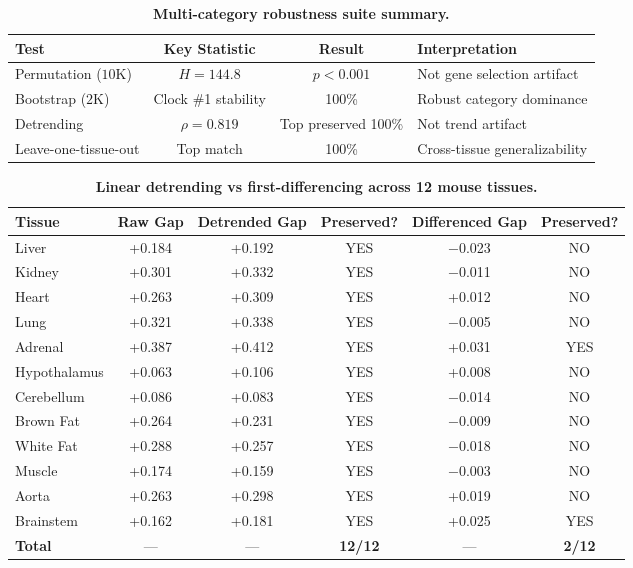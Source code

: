\documentclass[11pt,a4paper]{article}
\begin{document}
\begin{table}[H]
\centering
\caption{\textbf{Multi-category robustness suite summary.}}
\label{tab:multicat_robust}
\begin{tabular}{lccl}
\toprule
\textbf{Test} & \textbf{Key Statistic} & \textbf{Result} & \textbf{Interpretation} \\
\midrule
Permutation ($10$K) & $H = 144.8$ & $p < 0.001$ & Not gene selection artifact \\
Bootstrap ($2$K) & Clock \#1 stability & 100\% & Robust category dominance \\
Detrending & $\rho = 0.819$ & Top preserved 100\% & Not trend artifact \\
Leave-one-tissue-out & Top match & 100\% & Cross-tissue generalizability \\
\bottomrule
\end{tabular}
\end{table}

\begin{table}[H]
\centering
\caption{\textbf{Linear detrending vs first-differencing across 12 mouse tissues.}}
\label{tab:detrend}
\begin{tabular}{lccccc}
\toprule
Tissue & Raw Gap & Detrended Gap & Preserved? & Differenced Gap & Preserved? \\
\midrule
Liver & +0.184 & +0.192 & YES & $-$0.023 & NO \\
Kidney & +0.301 & +0.332 & YES & $-$0.011 & NO \\
Heart & +0.263 & +0.309 & YES & +0.012 & NO \\
Lung & +0.321 & +0.338 & YES & $-$0.005 & NO \\
Adrenal & +0.387 & +0.412 & YES & +0.031 & YES \\
Hypothalamus & +0.063 & +0.106 & YES & +0.008 & NO \\
Cerebellum & +0.086 & +0.083 & YES & $-$0.014 & NO \\
Brown Fat & +0.264 & +0.231 & YES & $-$0.009 & NO \\
White Fat & +0.288 & +0.257 & YES & $-$0.018 & NO \\
Muscle & +0.174 & +0.159 & YES & $-$0.003 & NO \\
Aorta & +0.263 & +0.298 & YES & +0.019 & NO \\
Brainstem & +0.162 & +0.181 & YES & +0.025 & YES \\
\midrule
\textbf{Total} & --- & --- & \textbf{12/12} & --- & \textbf{2/12} \\
\bottomrule
\end{tabular}
\end{table}
\end{document}
